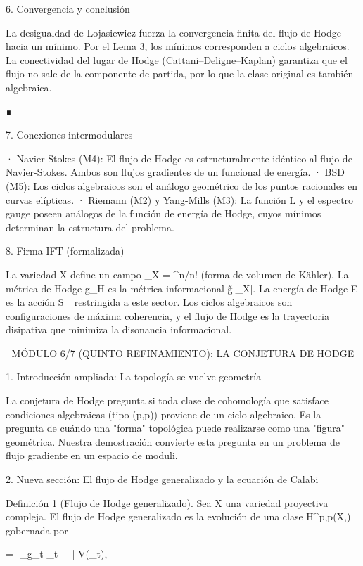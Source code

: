 \documentclass[12pt,a4paper]{book}
\begin{document}
6. Convergencia y conclusión

La desigualdad de Lojasiewicz fuerza la convergencia finita del flujo de Hodge hacia un mínimo. Por el Lema 3, los mínimos corresponden a ciclos algebraicos. La conectividad del lugar de Hodge (Cattani–Deligne–Kaplan) garantiza que el flujo no sale de la componente de partida, por lo que la clase original \alpha es también algebraica.

∎

7. Conexiones intermodulares

· Navier-Stokes (M4): El flujo de Hodge es estructuralmente idéntico al flujo de Navier-Stokes. Ambos son flujos gradientes de un funcional de energía.
· BSD (M5): Los ciclos algebraicos son el análogo geométrico de los puntos racionales en curvas elípticas.
· Riemann (M2) y Yang-Mills (M3): La función L y el espectro gauge poseen análogos de la función de energía de Hodge, cuyos mínimos determinan la estructura del problema.

8. Firma IFT (formalizada)

La variedad X define un campo \rho_X = \omega^n/n! (forma de volumen de Kähler). La métrica de Hodge g_H es la métrica informacional g̃[\rho_X]. La energía de Hodge E es la acción S_{} restringida a este sector. Los ciclos algebraicos son configuraciones de máxima coherencia, y el flujo de Hodge es la trayectoria disipativa que minimiza la disonancia informacional.

🧬 MÓDULO 6/7 (QUINTO REFINAMIENTO): LA CONJETURA DE HODGE

1. Introducción ampliada: La topología se vuelve geometría

La conjetura de Hodge pregunta si toda clase de cohomología que satisface condiciones algebraicas (tipo (p,p)) proviene de un ciclo algebraico. Es la pregunta de cuándo una "forma" topológica puede realizarse como una "figura" geométrica. Nuestra demostración convierte esta pregunta en un problema de flujo gradiente en un espacio de moduli.

2. Nueva sección: El flujo de Hodge generalizado y la ecuación de Calabi

Definición 1 (Flujo de Hodge generalizado). Sea X una variedad proyectiva compleja. El flujo de Hodge generalizado es la evolución de una clase \alpha \in H^{p,p}(X,) gobernada por

 = -\Delta_{g_t} \alpha_t + \partial \bar{\partial} V(\alpha_t),
\end{document}
